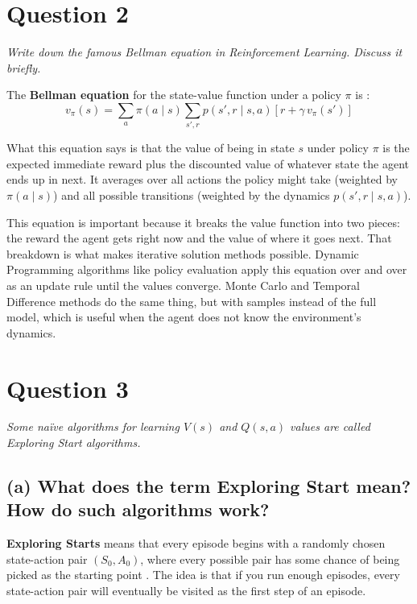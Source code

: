 \documentclass[letterpaper]{article}
\begin{document}
\section*{Question 2}
\textit{Write down the famous Bellman equation in Reinforcement Learning. Discuss it briefly.}

\vspace{0.5em}

The \textbf{Bellman equation} for the state-value function under a policy $\pi$ is \citep{sutton2018reinforcement}:
\[
v_\pi(s) = \sum_{a} \pi(a \mid s) \sum_{s', r} p(s', r \mid s, a) \left[ r + \gamma \, v_\pi(s') \right]
\]

What this equation says is that the value of being in state $s$ under policy $\pi$ is the expected immediate reward plus the discounted value of whatever state the agent ends up in next. It averages over all actions the policy might take (weighted by $\pi(a \mid s)$) and all possible transitions (weighted by the dynamics $p(s', r \mid s, a)$).

This equation is important because it breaks the value function into two pieces: the reward the agent gets right now and the value of where it goes next. That breakdown is what makes iterative solution methods possible. Dynamic Programming algorithms like policy evaluation apply this equation over and over as an update rule until the values converge. Monte Carlo and Temporal Difference methods do the same thing, but with samples instead of the full model, which is useful when the agent does not know the environment's dynamics.

\section*{Question 3}
\textit{Some na\"ive algorithms for learning $V(s)$ and $Q(s, a)$ values are called Exploring Start algorithms.}

\subsection*{(a) What does the term Exploring Start mean? How do such algorithms work?}

\textbf{Exploring Starts} means that every episode begins with a randomly chosen state-action pair $(S_0, A_0)$, where every possible pair has some chance of being picked as the starting point \citep{sutton2018reinforcement}. The idea is that if you run enough episodes, every state-action pair will eventually be visited as the first step of an episode.
\end{document}
